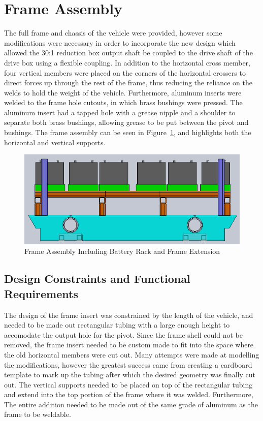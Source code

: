 \section{Frame Assembly}
The full frame and chassis of the vehicle were provided, however some modifications were necessary in order to incorporate the new design which allowed the 30:1 reduction box output shaft be coupled to the drive shaft of the drive box using a flexible coupling. In addition to the horizontal cross member, four vertical members were placed on the corners of the horizontal crossers to direct forces up through the rest of the frame, thus reducing the reliance on the welds to hold the weight of the vehicle. Furthermore, aluminum inserts were welded to the frame hole cutouts, in which brass bushings were pressed. The aluminum insert had a tapped hole with a grease nipple and a shoulder to separate both brass bushings, allowing grease to be put between the pivot and bushings. The frame assembly can be seen in Figure~\ref{fig:battery_rack_and_frame_mount_drw}, and highlights both the horizontal and vertical supports.   
\begin{figure}[h]
\centering
\includegraphics[width=0.8\linewidth]{./images/battery_rack_and_frame_mount_drw}
\caption{Frame Assembly Including Battery Rack and Frame Extension}
\label{fig:battery_rack_and_frame_mount_drw}
\end{figure}
\subsection{Design Constraints and Functional Requirements}
The design of the frame insert was constrained by the length of the vehicle, and needed to be made out rectangular tubing with a large enough height to accomodate the output hole for the pivot. Since the frame shell could not be removed, the frame insert needed to be custom made to fit into the space where the old horizontal members were cut out. Many attempts were made at modelling the modifications, however the greatest success came from creating a cardboard template to mark up the tubing after which the desired geometry was finally cut out. The vertical supports needed to be placed on top of the rectangular tubing and extend into the top portion of the frame where it was welded. Furthermore, The entire addition needed to be made out of the same grade of aluminum as the frame to be weldable.  

